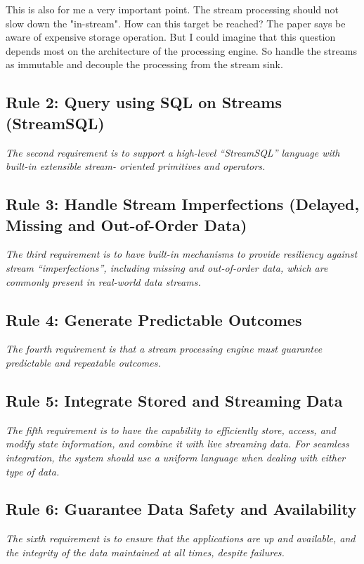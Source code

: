 This is also for me a very important point. The stream processing should not slow down the "in-stream".
How can this target be reached? The paper says be aware of expensive storage operation.
But I could imagine that this question depends most on the architecture of the processing engine.
So handle the streams as immutable and decouple the processing from the stream sink.


\subsection{Rule 2: Query using SQL on Streams (StreamSQL)}
\textit{The second requirement is to support a high-level
        “StreamSQL” language with built-in extensible stream-
        oriented primitives and operators.}

\subsection{Rule 3: Handle Stream Imperfections (Delayed, Missing
and Out-of-Order Data)}

\textit{The third requirement is to have built-in mechanisms to
        provide resiliency against stream “imperfections”,
        including missing and out-of-order data, which are
        commonly present in real-world data streams.}

\subsection{Rule 4: Generate Predictable Outcomes}
\textit{The fourth requirement is that a stream processing engine
        must guarantee predictable and repeatable outcomes.}


\subsection{Rule 5: Integrate Stored and Streaming Data}
\textit{The fifth requirement is to have the capability to efficiently
        store, access, and modify state information, and combine it
        with live streaming data. For seamless integration, the
        system should use a uniform language when dealing with
        either type of data.}

\subsection{Rule 6: Guarantee Data Safety and Availability}
\textit{The sixth requirement is to ensure that the applications are
        up and available, and the integrity of the data maintained at
        all times, despite failures.}


